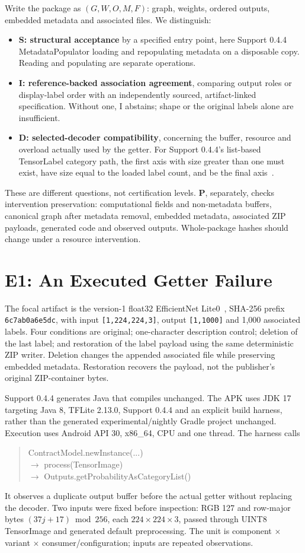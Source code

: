 \documentclass[10pt,conference]{IEEEtran}
\newcommand{\code}[1]{\texttt{#1}}
\begin{document}
Write the package as $(G,W,O,M,F)$: graph, weights, ordered outputs, embedded metadata and associated files. We distinguish:
\begin{itemize}
\item \textbf{S: structural acceptance} by a specified entry point, here Support 0.4.4 MetadataPopulator loading and repopulating metadata on a disposable copy. Reading and populating are separate operations.
\item \textbf{I: reference-backed association agreement}, comparing output roles or display-label order with an independently sourced, artifact-linked specification. Without one, I abstains; shape or the original labels alone are insufficient.
\item \textbf{D: selected-decoder compatibility}, concerning the buffer, resource and overload actually used by the getter. For Support 0.4.4's list-based TensorLabel category path, the first axis with size greater than one must exist, have size equal to the loaded label count, and be the final axis~\cite{tensorlabel}.
\end{itemize}
These are different questions, not certification levels. \textbf{P}, separately, checks intervention preservation: computational fields and non-metadata buffers, canonical graph after metadata removal, embedded metadata, associated ZIP payloads, generated code and observed outputs. Whole-package hashes should change under a resource intervention.

\section{E1: An Executed Getter Failure}
\label{sec:e1}
The focal artifact is the version-1 float32 EfficientNet Lite0~\cite{efficientnet}, SHA-256 prefix \code{6c7ab0a6e5dc}, with input \code{[1,224,224,3]}, output \code{[1,1000]} and 1,000 associated labels. Four conditions are original; one-character description control; deletion of the last label; and restoration of the label payload using the same deterministic ZIP writer. Deletion changes the appended associated file while preserving embedded metadata. Restoration recovers the payload, not the publisher's original ZIP-container bytes.

Support 0.4.4 generates Java that compiles unchanged. The APK uses JDK 17 targeting Java 8, TFLite 2.13.0, Support 0.4.4 and an explicit build harness, rather than the generated experimental/nightly Gradle project unchanged. Execution uses Android API 30, x86\_64, CPU and one thread. The harness calls
\begin{quote}\small\ttfamily\raggedright
ContractModel.newInstance(...)\\
\(\rightarrow\) process(TensorImage)\\
\(\rightarrow\) Outputs.getProbabilityAsCategoryList()
\end{quote}
It observes a duplicate output buffer before the actual getter without replacing the decoder. Two inputs were fixed before inspection: RGB 127 and row-major bytes $(37j+17)\bmod256$, each $224\times224\times3$, passed through UINT8 TensorImage and generated default preprocessing. The unit is component $\times$ variant $\times$ consumer/configuration; inputs are repeated observations.
\end{document}
